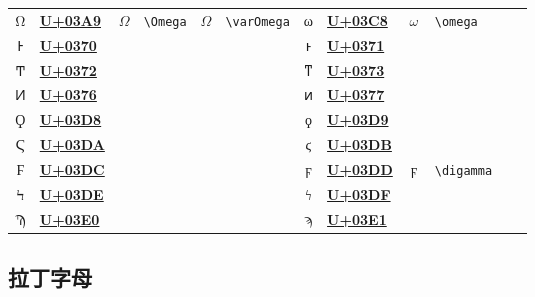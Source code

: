 \documentclass{ctexbook}
\newcommand{\rrun}[1]{\colorbox{Mulberry}{\href{https://unicode-table.com/#1/}{\color{White}\ttfamily{}\bfseries{}U+#1}}}
\begin{document}
\begin{table}[h!]
\begin{tabular}{c@{ }l c@{ }l c@{ }l c@{ }l c@{ }l c@{ }l}
		Ω & \rrun{03A9} &   $\Omega$ & \verb|\Omega|   & $\varOmega$   & \verb|\varOmega|   & ω & \rrun{03C8} &   $\omega$ & \verb|\omega|   &               &                    \\
		Ͱ & \rrun{0370} &            &                 &               &                    & ͱ & \rrun{0371} &            &                 &               &                    \\
		Ͳ & \rrun{0372} &            &                 &               &                    & ͳ & \rrun{0373} &            &                 &               &                    \\
		Ͷ & \rrun{0376} &            &                 &               &                    & ͷ & \rrun{0377} &            &                 &               &                    \\
		Ϙ & \rrun{03D8} &            &                 &               &                    & ϙ & \rrun{03D9} &            &                 &               &                    \\
		Ϛ & \rrun{03DA} &            &                 &               &                    & ϛ & \rrun{03DB} &            &                 &               &                    \\
		Ϝ & \rrun{03DC} &            &                 &               &                    & ϝ & \rrun{03DD} & $\digamma$ & \verb|\digamma| &               &                    \\
		Ϟ & \rrun{03DE} &            &                 &               &                    & ϟ & \rrun{03DF} &            &                 &               &                    \\
		Ϡ & \rrun{03E0} &            &                 &               &                    & ϡ & \rrun{03E1} &            &                 &               &                    \\
		\hline
	\end{tabular}
\end{table}

\newpage
\subsection{拉丁字母}
\end{document}
